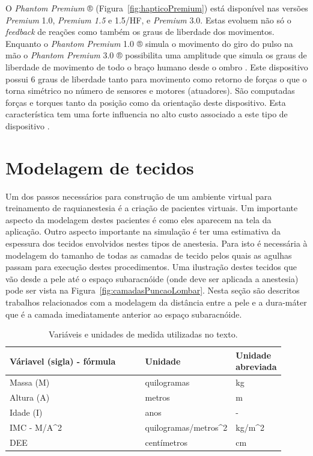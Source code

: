 O \textit{Phantom Premium} ® (Figura~\ref{fig:hapticoPremium}) está disponível nas versões \textit{Premium} 1.0, \textit{Premium 1.5} e 1.5/HF, e \textit{Premium} 3.0. Estas evoluem não só o \textit{feedback} de reações como também os graus de liberdade dos movimentos. Enquanto o \textit{Phantom Premium} 1.0 ® simula o movimento do giro do pulso na mão o \textit{Phantom Premium} 3.0 ® possibilita uma amplitude que simula os graus de liberdade de movimento de todo o braço humano desde o ombro \cite{3DSystems2018}. Este dispositivo possui 6 graus de liberdade tanto para movimento como retorno de forças o que o torna simétrico no número de sensores e motores (atuadores). São computadas forças e torques tanto da posição como da orientação deste dispositivo. Esta característica tem uma forte influencia no alto custo associado a este tipo de dispositivo \cite{Forsslund2013}.

\section{Modelagem de tecidos}

Um dos passos necessários para construção de um ambiente virtual para treinamento de raquianestesia é a criação de pacientes virtuais. Um importante aspecto da modelagem destes pacientes é como eles aparecem na tela da aplicação. Outro aspecto importante na simulação é ter uma estimativa da espessura dos tecidos envolvidos nestes tipos de anestesia. Para isto é necessária à modelagem do tamanho de todas as camadas de tecido pelos quais as agulhas passam para execução destes procedimentos. Uma ilustração destes tecidos que vão desde a pele até o espaço subaracnóide (onde deve ser aplicada a anestesia) pode ser vista na Figura~\ref{fig:camadasPuncaoLombar}. Nesta seção são descritos trabalhos relacionados com a modelagem da distância entre a pele e a dura-máter que é a camada imediatamente anterior ao espaço subaracnóide.

\begin{table}[!ht]
\begin{center}
\caption{Variáveis e unidades de medida utilizadas no texto.}
\label{tab:variaveisUnidades}
\begin{tabular}{|p{0.53\linewidth}|p{0.25\linewidth}|p{0.13\linewidth}|}
\hline
\textbf{Váriavel (sigla) - fórmula} & \textbf{Unidade} & \textbf{Unidade abreviada}\\
\hline\hline
Massa (M) & quilogramas & kg \\
Altura (A) & metros & m \\
Idade (I) & anos & - \\
\acrfull{IMC} - M/A\textasciicircum{}2 & quilogramas/metros\textasciicircum{}2 & kg/m\textasciicircum{}2 \\
\acrfull{DEE} & centímetros & cm \\
\hline
\end{tabular}
\end{center}
\end{table}

